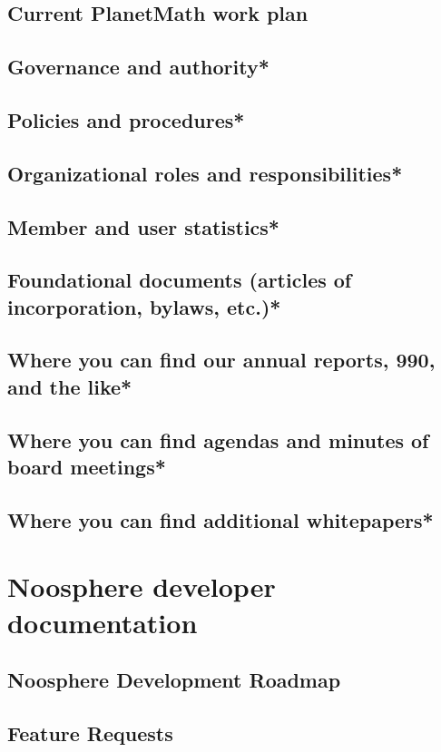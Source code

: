 \documentclass[12pt,report]{memoir}
\begin{document}
\section{Current PlanetMath work plan}


\section{Governance and authority*}
\section{Policies and procedures*}
\section{Organizational roles and responsibilities*}
\section{Member and user statistics*}
\section{Foundational documents (articles of incorporation, bylaws, etc.)*}
\section{Where you can find our annual reports, 990, and the like*}
\section{Where you can find agendas and minutes of board meetings*}
\section{Where you can find additional whitepapers*}

\chapter{Noosphere developer documentation}

\section{Noosphere Development Roadmap}


\section{Feature Requests}

\end{document}
